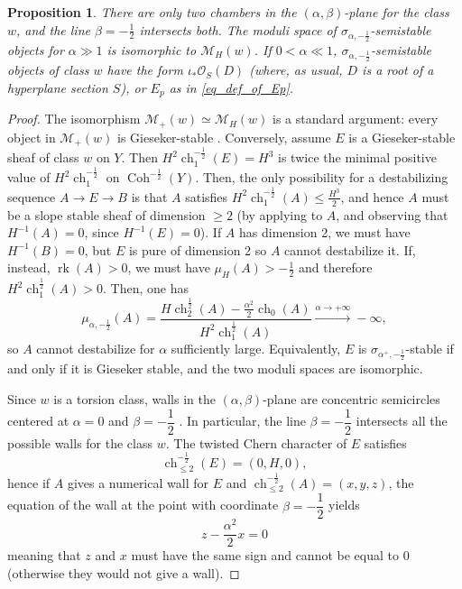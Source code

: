 \documentclass[11pt]{amsart}
\newtheorem{proposition}[thm]{Proposition}
\theoremstyle{definition}
\DeclareMathOperator{\rk}{rk}
\DeclareMathOperator{\Ch}{ch}
\DeclareMathOperator{\Coh}{Coh}
\newcommand{\sO}{\mathcal{O}}
\newcommand{\sM}{\mathcal{M}}
\begin{document}
\begin{proposition}\label{prop_tilt}
There are only two chambers in the $(\alpha,\beta)$-plane for the class $w$, and the line $\beta=-\frac 12$ intersects both. 
The moduli space of $\sigma_{\alpha,-\frac 12}$-semistable objects for $\alpha\gg 1$ is isomorphic to $\sM_H(w)$.
If $0< \alpha \ll 1$, $\sigma_{\alpha,-\frac 12}$-semistable objects of class $w$ have the form $\iota_*\sO_S(D)$ (where, as usual, $D$ is a root of a hyperplane section $S$), or $E_p$ as in \eqref{eq_def_of_Ep}.
\end{proposition}
\begin{proof}
The isomorphism $\sM_+(w)\simeq \sM_H(w)$ is a standard argument: every object in $\sM_+(w)$ is Gieseker-stable \cite[Lemma 7.2.1]{BMT14}. Conversely, assume $E$ is a Gieseker-stable sheaf of class $w$ on $Y$. Then $H^2\Ch^{-\frac 12}_1(E)=H^3$ is twice the minimal positive value of $H^2\Ch^{-\frac 12}_1$ on $\Coh^{-\frac12}(Y)$. Then, the only possibility for a destabilizing sequence $A \to E\to B$ is that $A$ satisfies $H^{2}\Ch^{-\frac12}_1(A)\leq\frac{H^3}{2}$, and hence $A$ must be a slope stable sheaf of dimension $\geq 2$ (by applying \cite[Lemma 7.2.2]{BMT14} to $A$, and observing that $H^{-1}(A)=0$, since $H^{-1}(E)=0$). If $A$ has dimension 2, we must have $H^{-1}(B)=0$, but $E$ is pure of dimension 2 so $A$ cannot destabilize it. If, instead, $\rk(A)>0$, we must have $\mu_H(A)>-\frac{1}{2}$ and therefore $H^2\Ch^{\frac 12}_1(A)>0$. Then, one has 
\[ \mu_{\alpha,-\frac12}(A)= \frac{H\Ch^{\frac12}_2(A) - \frac{\alpha^2}{2}\Ch_0(A)}{H^2\Ch^{\frac 12}_1(A)} \xrightarrow{\alpha \to +\infty} - \infty,\]
so $A$ cannot destabilize for $\alpha$ sufficiently large. Equivalently, $E$ is $\sigma_{\alpha^+,-\frac12}$-stable if and only if it is Gieseker stable, and the two moduli spaces are isomorphic.

Since $w$ is a torsion class, walls in the $(\alpha,\beta)$-plane are concentric semicircles centered at $\alpha=0$ and $\beta = -\dfrac{1}{2}$ \cite[Theorem 2.2]{BMSZ17}. In particular, the line $\beta = -\dfrac{1}{2}$ intersects all the possible walls for the class $w$. The twisted Chern character of $E$ satisfies
\[
\Ch^{-\frac{1}{2}}_{\leq 2}(E) = (0,H,0),
\]
hence if $A$ gives a numerical wall for $E$ and $\Ch^{-\frac{1}{2}}_{\leq 2}(A)=(x,y,z)$, the equation of the wall at the point with coordinate $\beta=-\dfrac{1}{2}$ yields
\[
z-\dfrac{\alpha^2}{2}x=0
\]
meaning that $z$ and $x$ must have the same sign and cannot be equal to 0 (otherwise they would not give a wall).


\end{proof}
\end{document}
